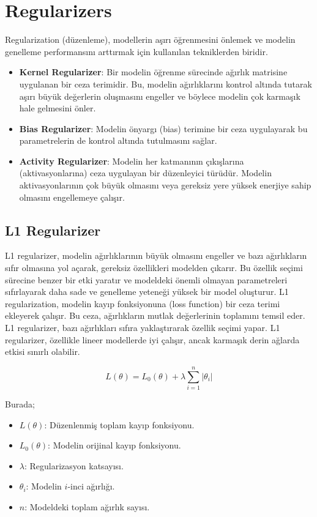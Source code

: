 \section{Regularizers}

Regularization (düzenleme), modellerin aşırı öğrenmesini önlemek ve modelin genelleme performansını arttırmak için kullanılan tekniklerden biridir.

\begin{itemize}
    \item \textbf{Kernel Regularizer}: Bir modelin öğrenme sürecinde ağırlık matrisine uygulanan bir ceza terimidir. Bu, modelin ağırlıklarını kontrol altında tutarak aşırı büyük değerlerin oluşmasını engeller ve böylece modelin çok karmaşık hale gelmesini önler.
    \item \textbf{Bias Regularizer}: Modelin önyargı (bias) terimine bir ceza uygulayarak bu parametrelerin de kontrol altında tutulmasını sağlar.
    \item \textbf{Activity Regularizer}: Modelin her katmanının çıkışlarına (aktivasyonlarına) ceza uygulayan bir düzenleyici türüdür. Modelin aktivasyonlarının çok büyük olmasını veya gereksiz yere yüksek enerjiye sahip olmasını engellemeye çalışır.
\end{itemize}

\newpage

\subsection{L1 Regularizer}

L1 regularizer, modelin ağırlıklarının büyük olmasını engeller ve bazı ağırlıkların sıfır olmasına yol açarak, gereksiz özellikleri modelden çıkarır. Bu özellik seçimi sürecine benzer bir etki yaratır ve modeldeki önemli olmayan parametreleri sıfırlayarak daha sade ve genelleme yeteneği yüksek bir model oluşturur. L1 regularization, modelin kayıp fonksiyonuna (loss function) bir ceza terimi ekleyerek çalışır. Bu ceza, ağırlıkların mutlak değerlerinin toplamını temsil eder. L1 regularizer, bazı ağırlıkları sıfıra yaklaştırarak özellik seçimi yapar. L1 regularizer, özellikle lineer modellerde iyi çalışır, ancak karmaşık derin ağlarda etkisi sınırlı olabilir.

\[ L(\theta) = L_{0}(\theta) + \lambda \sum_{i = 1}^{n} |{\theta_{i}}| \]

Burada;

\begin{itemize}
    \item $L(\theta)$: Düzenlenmiş toplam kayıp fonksiyonu.
    \item $L_{0}(\theta)$: Modelin orijinal kayıp fonksiyonu.
    \item $\lambda$: Regularizasyon katsayısı.
    \item $\theta_{i}$: Modelin $i$-inci ağırlığı.
    \item $n$: Modeldeki toplam ağırlık sayısı.
\end{itemize}

